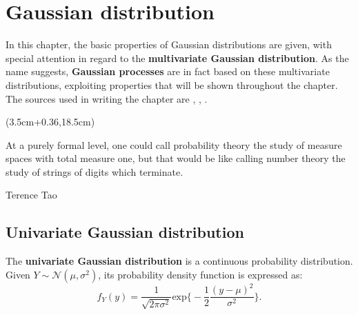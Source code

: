 \chapter{Gaussian distribution}
In this chapter, the basic properties of Gaussian distributions are given, with special attention in regard to the \textbf{multivariate Gaussian distribution}. As the name suggests, \textbf{Gaussian processes} are in fact based on these multivariate distributions, exploiting properties that will be shown throughout the chapter.\\
The sources used in writing the chapter are \cite{gut_intermediate_2009}, \cite{wilkinson_introduction_2020}, \cite{murphy_probabilistic_2022}.


\begin{textblock*}{0.64\textwidth}(3.5cm+0.36\textwidth,18.5cm)
\epigraph{At a purely formal level, one could call probability theory the study of measure spaces with total measure one, but that would be like calling number theory the study of strings of digits which terminate.}{Terence Tao}
\end{textblock*}

\newpage



\section{Univariate Gaussian distribution}
\begin{defi}
    The \textbf{univariate Gaussian distribution} is a continuous probability distribution. \\
    Given $Y\sim \mathcal{N}(\mu, \sigma^2)$, its probability density function is expressed as:
    \[f_Y(y) = \frac{1}{\sqrt{2\pi \sigma^2}} \text{exp}\bigg\{-\frac{1}{2}\frac{(y-\mu)^2}{\sigma^2}\bigg\}.\]
\end{defi}


